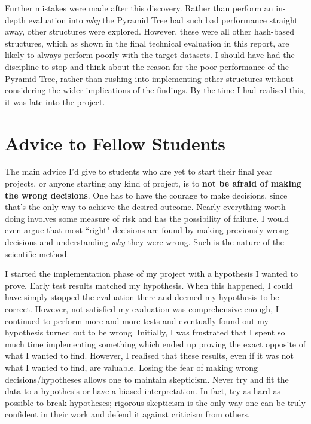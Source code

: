 Further mistakes were made after this discovery. Rather than perform an in-depth evaluation into \textit{why} the Pyramid Tree had such bad performance straight away, other structures were explored. However, these were all other hash-based structures, which as shown in the final technical evaluation in this report, are likely to always perform poorly with the target datasets. I should have had the discipline to stop and think about the reason for the poor performance of the Pyramid Tree, rather than rushing into implementing other structures without considering the wider implications of the findings. By the time I had realised this, it was late into the project.

\section{Advice to Fellow Students}

The main advice I'd give to students who are yet to start their final year projects, or anyone starting any kind of project, is to \textbf{not be afraid of making the wrong decisions}. One has to have the courage to make decisions, since that's the only way to achieve the desired outcome. Nearly everything worth doing involves some measure of risk and has the possibility of failure. I would even argue that most ``right" decisions are found by making previously wrong decisions and understanding \textit{why} they were wrong. Such is the nature of the scientific method.

I started the implementation phase of my project with a hypothesis I wanted to prove. Early test results matched my hypothesis. When this happened, I could have simply stopped the evaluation there and deemed my hypothesis to be correct. However, not satisfied my evaluation was comprehensive enough, I continued to perform more and more tests and eventually found out my hypothesis turned out to be wrong. Initially, I was frustrated that I spent so much time implementing something which ended up proving the exact opposite of what I wanted to find. However, I realised that these results, even if it was not what I wanted to find, are valuable. Losing the fear of making wrong decisions/hypotheses allows one to maintain skepticism. Never try and fit the data to a hypothesis or have a biased interpretation. In fact, try as hard as possible to break hypotheses; rigorous skepticism is the only way one can be truly confident in their work and defend it against criticism from others.

